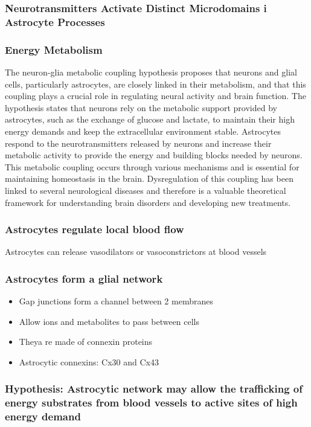 \begin{itemize}
\begin{itemize}
\subsubsection{Neurotransmitters Activate Distinct Microdomains i Astrocyte Processes}

\subsubsection{Energy Metabolism}
The neuron-glia metabolic coupling hypothesis proposes that neurons and glial cells, particularly astrocytes, are closely linked in their metabolism, and that this coupling plays a crucial role in regulating neural activity and brain function. The hypothesis states that neurons rely on the metabolic support provided by astrocytes, such as the exchange of glucose and lactate, to maintain their high energy demands and keep the extracellular environment stable. Astrocytes respond to the neurotransmitters released by neurons and increase their metabolic activity to provide the energy and building blocks needed by neurons. This metabolic coupling occurs through various mechanisms and is essential for maintaining homeostasis in the brain. Dysregulation of this coupling has been linked to several neurological diseases and therefore is a valuable theoretical framework for understanding brain disorders and developing new treatments.
\subsubsection{Astrocytes regulate local blood flow}
Astrocytes can release vasodilators or vasoconstrictors at blood vessels
\subsubsection{Astrocytes form a glial network}
\begin{itemize}
    \item Gap junctions form a channel between 2 membranes
    \item Allow ions and metabolites to pass between cells
    \item Theya re made of connexin proteins
    \item Astrocytic connexins: Cx30 and Cx43
\end{itemize}

\subsubsection{Hypothesis: Astrocytic network may allow the trafficking of energy substrates from blood vessels to active sites of high energy demand}

\end{itemize}
\end{itemize}

